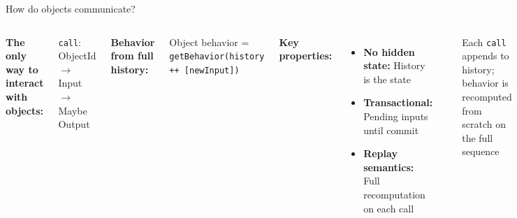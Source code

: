 \documentclass[handout,aspectratio=169,xcolor=dvipsnames,10pt]{beamer}
\begin{document}

\begin{frame}{How do objects communicate?}

\begin{columns}[T]

\textbf{The only way to interact with objects:}

\vspace{0.3em}

\texttt{call}: ObjectId $\to$ Input $\to$ Maybe Output

\vspace{0.5em}

\textbf{Behavior from full history:}

\vspace{0.3em}

Object behavior = \texttt{getBehavior(history ++ [newInput])}

\vspace{0.5em}

\textbf{Key properties:}

\begin{itemize}\scriptsize
  \item \textbf{No hidden state:} History is the state
  \item \textbf{Transactional:} Pending inputs until commit
  \item \textbf{Replay semantics:} Full recomputation on each call
\end{itemize}


\begin{center}
\end{center}

\vspace{1em}

{\small Each \texttt{call} appends to history; behavior is recomputed from scratch on the full sequence}

\end{columns}

\end{frame}
\end{document}
